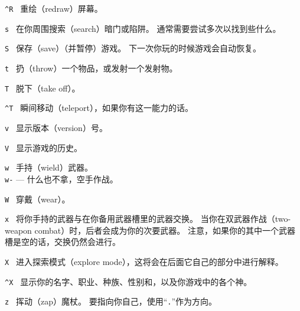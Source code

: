\documentclass[a4paper, 10pt]{article}
\newcommand{\tb}[1]{\tt #1 \hfill}
\begin{document}
\item[\tb{\^{}R}]
重绘（redraw）屏幕。
\item[\tb{s}]
在你周围搜索（search）暗门或陷阱。
通常需要尝试多次以找到些什么。
\item[\tb{S}]
保存（save）（并暂停）游戏。
下一次你玩的时候游戏会自动恢复。
\item[\tb{t}]
扔（throw）一个物品，或发射一个发射物。
\item[\tb{T}]
脱下（take off）\zhTransArmor{}。
\item[\tb{\^{}T}]
瞬间移动（teleport），如果你有这一能力的话。
\item[\tb{v}]
显示版本（version）号。
\item[\tb{V}]
显示游戏的历史。
\item[\tb{w}]
手持（wield）武器。\\
{\tt w-} --- 什么也不拿，空手作战。
\item[\tb{W}]
穿戴（wear）\zhTransArmor。
\item[\tb{x}]
将你手持的武器与在你备用武器槽里的武器交换。
当你在双武器作战（two-weapon combat）时，后者会成为你的次要武器。
注意，如果你的其中一个武器槽是空的话，交换仍然会进行。
\item[\tb{X}]
进入探索模式（explore mode），这将会在后面它自己的部分中进行解释。
\item[\tb{\^{}X}]
显示你的名字、职业、种族、性别和\zhTransAlignment，以及你游戏中的各个神。
\item[\tb{z}]
挥动（zap）魔杖。
要指向你自己，使用“{\tt .}”作为方向。
\end{document}
